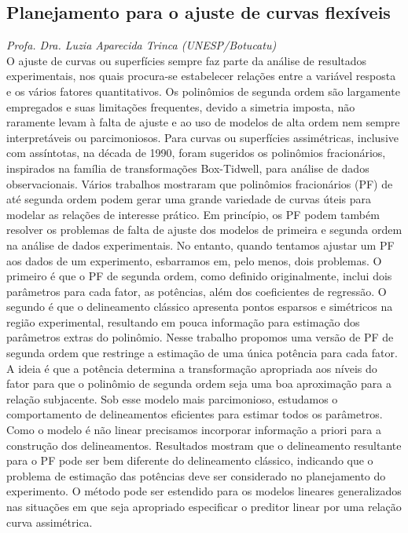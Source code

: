 \documentclass[12pt, twoside, a4paper]{article}
\begin{document}
\subsection*{Planejamento para o ajuste de curvas flexíveis}
\vspace{-0.2cm}
\textit{\large Profa. Dra. Luzia Aparecida Trinca
  (UNESP/Botucatu)}\\[0.3cm]
O ajuste de curvas ou superfícies sempre faz parte da análise de
resultados experimentais, nos quais procura-se estabelecer relações
entre a variável resposta e os vários fatores quantitativos. Os
polinômios de segunda ordem são largamente empregados e suas limitações
frequentes, devido a simetria imposta, não raramente levam à falta de
ajuste e ao uso de modelos de alta ordem nem sempre interpretáveis ou
parcimoniosos. Para curvas ou superfícies assimétricas, inclusive com
assíntotas, na década de 1990, foram sugeridos os polinômios
fracionários, inspirados na família de transformações Box-Tidwell, para
análise de dados observacionais. Vários trabalhos mostraram que
polinômios fracionários (PF) de até segunda ordem podem gerar uma grande
variedade de curvas úteis para modelar as relações de interesse
prático. Em princípio, os PF podem também resolver os problemas de falta
de ajuste dos modelos de primeira e segunda ordem na análise de dados
experimentais. No entanto, quando tentamos ajustar um PF aos dados de um
experimento, esbarramos em, pelo menos, dois problemas. O primeiro é que
o PF de segunda ordem, como definido originalmente, inclui dois
parâmetros para cada fator, as potências, além dos coeficientes de
regressão. O segundo é que o delineamento clássico apresenta pontos
esparsos e simétricos na região experimental, resultando em pouca
informação para estimação dos parâmetros extras do polinômio. Nesse
trabalho propomos uma versão de PF de segunda ordem que restringe a
estimação de uma única potência para cada fator. A ideia é que a
potência determina a transformação apropriada aos níveis do fator para
que o polinômio de segunda ordem seja uma boa aproximação para a relação
subjacente. Sob esse modelo mais parcimonioso, estudamos o comportamento
de delineamentos eficientes para estimar todos os parâmetros. Como o
modelo é não linear precisamos incorporar informação a priori para a
construção dos delineamentos. Resultados mostram que o delineamento
resultante para o PF pode ser bem diferente do delineamento clássico,
indicando que o problema de estimação das potências deve ser considerado
no planejamento do experimento. O método pode ser estendido para os
modelos lineares generalizados nas situações em que seja apropriado
especificar o preditor linear por uma relação curva assimétrica.
\vspace{.2cm}
\end{document}
